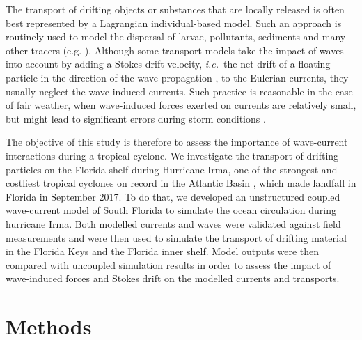 \documentclass[preprint,12pt,authoryear]{elsarticle}
\newcommand{\ie}{{\it i.e.}\ }
\begin{document}
The transport of drifting objects or substances that are locally released is often best represented by a Lagrangian individual-based model. Such an approach is routinely used to model the dispersal of larvae, pollutants, sediments and many other tracers (e.g. \cite{le2012surface,liubartseva2018tracking, figueiredo2013synthesizing,frys2020fine}). Although some transport models take the impact of waves into account by adding a Stokes drift velocity, \ie the net drift of a floating particle in the direction of the wave propagation \citep{van2018stokes}, to the Eulerian currents, they usually neglect the wave-induced currents. Such practice is reasonable in the case of fair weather, when wave-induced forces exerted on currents are relatively small, but might lead to significant errors during storm conditions \citep{rohrs2012observation,curcic2016hurricane}. 

The objective of this study is therefore to assess the importance of wave-current interactions during a tropical cyclone. We investigate the transport of drifting particles on the Florida shelf during Hurricane Irma, one of the strongest and costliest tropical cyclones on record in the Atlantic Basin \citep{xian2018brief}, which made landfall in Florida in September 2017. To do that, we developed an unstructured coupled wave-current model of South Florida to simulate the ocean circulation during hurricane Irma. Both modelled currents and waves were validated against field measurements and were then used to simulate the transport of drifting material in the Florida Keys and the Florida inner shelf. Model outputs were then compared with uncoupled simulation results in order to assess the impact of wave-induced forces and Stokes drift on the modelled currents and transports.  

\section{Methods}
\end{document}
